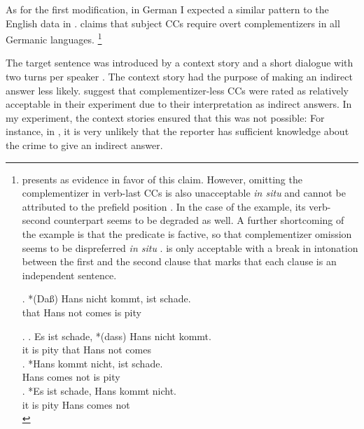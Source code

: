 As for the first modification, in German I expected a similar pattern to the English data in \citet{merchant.etal2013}. \citet[83]{webelhuth1992} claims that subject CCs require overt complementizers in all Germanic languages.%
%
\footnote{\citeauthor{webelhuth1992} presents \Next as evidence in favor of this claim. However, omitting the complementizer in verb-last CCs is also unacceptable \textit{in situ} and cannot be attributed to the prefield position \NNext[a]. In the case of the example, its verb-second counterpart \NNext[b] seems to be degraded as well. A further shortcoming of the example is that the predicate is factive, so that complementizer omission seems to be dispreferred \textit{in situ} \NNext[c]. \NNext[c] is only acceptable with a break in intonation between the first and the second clause that marks that each clause is an independent sentence.

\exg. *(Da\ss) Hans nicht kommt, ist schade.\\
that Hans not comes is pity\\

\ex. \ag. Es ist schade, *(dass) Hans nicht kommt.\\
	  it is pity that Hans not comes\\
     \bg. *Hans kommt nicht, ist schade.\\
	  Hans comes not is pity\\
    \cg.  *Es ist schade, Hans kommt nicht.\\
	  it is  pity Hans comes not\\


}\afterfn %

\noindent The target sentence was introduced by a context story and a short dialogue with two turns per speaker \Next. The context story had the purpose of making an indirect answer less likely. \citet{merchant.etal2013} suggest that complementizer-less CCs were rated as relatively acceptable in their experiment due to their interpretation as indirect answers. In my experiment, the context stories ensured that this was not possible: For instance, in \Next, it is very unlikely that the reporter has sufficient knowledge about the crime to give an indirect answer.
\largerpage


